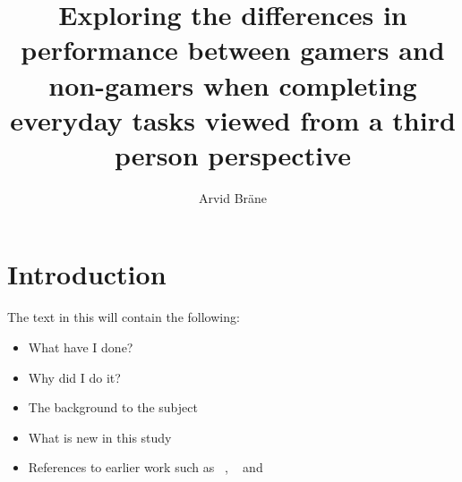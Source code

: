 \documentclass[runningheads,a4paper,oribibl]{llncs}
\begin{document}
\pagestyle{headings}

\mainmatter

\title{Exploring the differences in performance between gamers and non-gamers when completing everyday tasks viewed from a third person perspective}



\author{Arvid Bräne}


\maketitle






\section{Introduction}
The text in this will contain the following:
\begin{itemize}
	\item What have I done?
	\item Why did I do it?
	\item The background to the subject
	\item What is new in this study
	\item References to earlier work such as ~\cite{schmierbach2011exploring}, ~\cite{salamin2006benefits} and ~\cite{nakamura20103pi}

\end{itemize}
\end{document}

